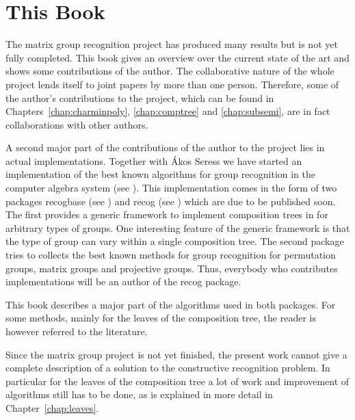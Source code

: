 \section{This Book}

The matrix group recognition project has produced many
results but is not yet fully completed.
This book gives an overview over the current state of the art and
shows some contributions of the author. The collaborative nature of the
whole project lends itself to joint papers by more than one person.
Therefore, some of the author's contributions to the project, which can
be found in Chapters~\ref{chap:charminpoly}, \ref{chap:comptree} and
\ref{chap:subsemi}, are in fact collaborations with other authors.

A second major part of the contributions of the author to the project lies
in actual implementations. Together with \'Akos Seress we have started an
implementation of the best known algorithms for group recognition in the
{\GAP} computer algebra system (see \cite{GAP4}). This implementation comes
in the form of two {\GAP} packages \textsf{recogbase} (see
\cite{recogbase}) and \textsf{recog} (see \cite{recog})
which are due to be published soon. The first provides a generic framework
to implement composition trees in {\GAP} for arbitrary types of groups. 
One interesting feature of the generic framework is that the type of group
can vary within a single composition tree. The
second package tries to collects the best known methods for group
recognition for permutation groups, matrix groups and projective groups.
Thus, everybody who contributes implementations will be an author of the
\textsf{recog} package. 

This book describes a major part of the algorithms used in both
packages. For some methods, mainly for the leaves of the composition tree,
the reader is however referred to the literature.

Since the matrix group project is not yet finished, the present work
cannot give a complete description of a solution to the constructive
recognition problem. In particular for the leaves of the composition tree
a lot of work and improvement of algorithms still has to be done, as is
explained in more detail in Chapter~\ref{chap:leaves}.


